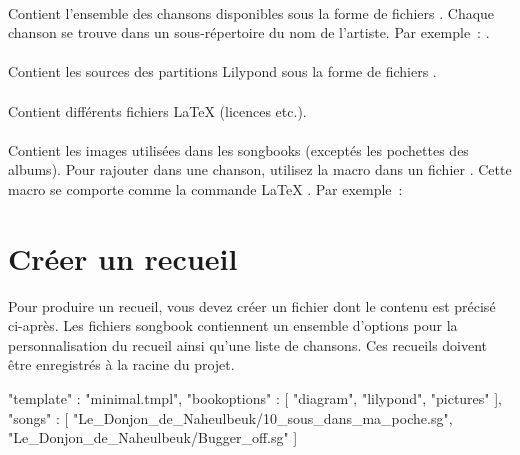 \paragraph{}
Contient l'ensemble des chansons disponibles sous la forme de fichiers
. Chaque chanson se trouve dans un sous-répertoire du nom
de l'artiste. Par exemple~:
.

\paragraph{}
Contient les sources des partitions Lilypond sous la forme de fichiers
.

\paragraph{}
Contient différents fichiers \LaTeX{} (licences etc.).

\paragraph{}
Contient les images utilisées dans les songbooks (exceptés les
pochettes des albums). Pour rajouter  dans une
chanson, utilisez la macro  dans un fichier
. Cette macro se comporte comme la commande \LaTeX{}
. Par exemple~:

\begin{songbook}
\end{songbook}

\section{Créer un recueil}
\label{sec:create-songbook}

Pour produire un recueil, vous devez créer un fichier 
dont le contenu est précisé ci-après. Les fichiers songbook
 contiennent un ensemble d'options pour la
personnalisation du recueil ainsi qu'une liste de chansons.
Ces recueils doivent être enregistrés à la racine du projet.

\begin{code}
{
"template" : "minimal.tmpl",
"bookoptions" : [
    "diagram",
    "lilypond",
    "pictures"
  ],
"songs" : [
    "Le_Donjon_de_Naheulbeuk/10_sous_dans_ma_poche.sg",
    "Le_Donjon_de_Naheulbeuk/Bugger_off.sg"
  ]
}
\end{code}

